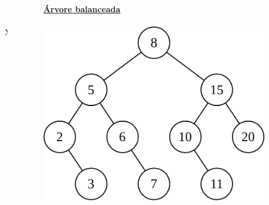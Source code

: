 \documentclass[aspectratio=169]{beamer}
\begin{document}
\begin{frame}
\begin{columns}[T]
\begin{column}{0.45\linewidth}
\end{column}
\begin{column}{0.10\linewidth}
~\\~\\X
\end{column}
\begin{column}{0.45\linewidth}
\begin{figure}[h]
	\centering
	\textbf{\underline{Árvore balanceada}}\\~\\
	\includegraphics[height=0.32\paperheight]{imagens/avl01.png}
\end{figure}
	\end{column}
\end{columns}
\end{frame}	
\end{document}

